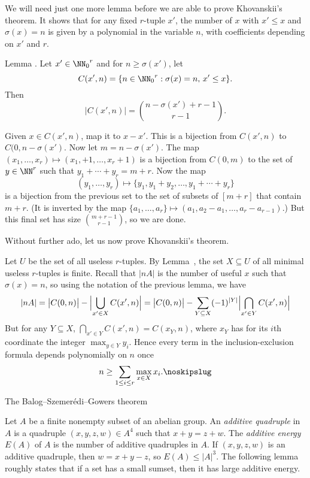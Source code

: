 We will need just one more lemma before we are able to prove Khovanskii's theorem. It shows that
for any fixed $r$-tuple $x'$, the number of $x$ with $x'\le x$ and $\sigma(x) = n$
is given by a polynomial in the variable $n$, with coefficients depending on $x'$ and $r$.

\proclaim Lemma {\advthm}. Let $x'\in {\NN_0}^r$ and for $n\ge \sigma(x')$, let
$$C(x', n) = \{n\in {\NN_0}^r : \sigma(x) = n,\,x'\le x\}.$$
Then
$$\bigl| C(x',n)\bigr| = {n-\sigma(x') + r-1 \choose r-1}.$$

\proof Given $x\in C(x',n)$, map it to $x-x'$. This is a bijection from $C(x',n)$ to $C(0, n-\sigma(x')$.
Now let $m = n-\sigma(x')$. The map $(x_1,\ldots,x_r) \mapsto (x_1,+1,\ldots, x_r+1)$ is a bijection
from $C(0,m)$ to the set of $y\in \NN^r$ such that $y_1+\cdots+y_r = m+r$. Now the map
$$(y_1,\ldots,y_r) \mapsto \{y_1, y_1+y_2, \ldots, y_1+\cdots+y_r\}$$
is a bijection from the previous set to the set of subsets of $[m+r]$ that contain $m+r$. (It is
inverted by the map $\{a_1, \ldots, a_r\} \mapsto (a_1, a_2-a_1, \ldots, a_r-a_{r-1})$.) But this final
set has size ${m+r-1\choose r-1}$, so we are done.\slug

Without further ado, let us now prove Khovanskii's theorem.

\medskip{}\enspace Let $U$ be the set of all
useless $r$-tuples. By Lemma~{\lemminimalfinite}, the set $X\subseteq U$ of all minimal useless
$r$-tuples is finite. Recall that $|nA|$ is the number of useful $x$ such that $\sigma(x) = n$,
so using the notation of the previous lemma, we have
$$|nA| = \bigl| C(0,n)\bigr| - \Bigl| \bigcup_{x'\in X} C(x',n)\Bigr|
=\bigl| C(0,n)\bigr| - \sum_{Y\subseteq X} (-1)^{|Y|} \Bigl| \bigcap_{x'\in Y} C(x',n)\Bigr| $$
But for any $Y\subseteq X$, $\bigcap_{x'\in Y} C(x',n) = C(x_Y, n)$, where $x_Y$ has for its
$i$th coordinate the integer $\max_{y\in Y} y_i$. Hence every term in the inclusion-exclusion
formula depends polynomially on $n$ once
$$n\ge \sum_{1\le i\le r} \max_{x\in X} x_i.\noskipslug$$

\advsect The Balog--Szemer\'edi--Gowers theorem

Let $A$ be a finite nonempty subset of an abelian group. An {\it additive quadruple} in
$A$ is a quadruple $(x,y,z,w)\in A^4$ such that $x+y = z+w$. The {\it additive energy}
$E(A)$ of $A$ is the number of additive quadruples in $A$. If $(x,y,z,w)$ is an additive
quadruple, then $w = x+y-z$, so $E(A)\le |A|^3$. The following lemma roughly states that if
a set has a small sumset, then it has large additive energy.

